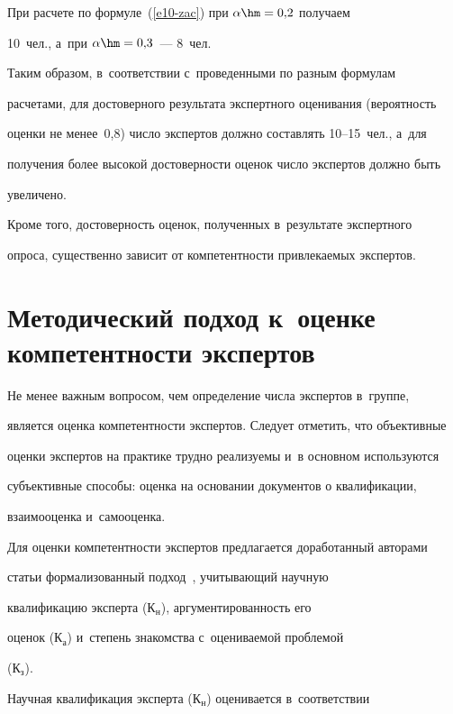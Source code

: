   При расчете по формуле~(\ref{e10-zac}) при $\alpha\hm = 0{,}2$ получаем 

10~чел., а~при $\alpha\hm = 0{,}3$~---  8~чел.

  

  Таким образом, в~соответствии с~проведенными по разным формулам 

расчетами, для достоверного результата экспертного оценивания (вероятность 

оценки не менее~0,8) число экспертов должно составлять 10--15~чел., а~для 

получения более высокой достоверности оценок число экспертов должно быть 

увеличено.

  

  Кроме того, достоверность оценок, полученных в~результате экспертного 

опроса, существенно зависит от компетентности привлекаемых экспертов. 

  

\section{Методический подход к~оценке компетентности экспертов}



  Не менее важным вопросом, чем определение числа экспертов в~группе, 

является оценка компетентности экспертов. Следует отметить, что объективные 

оценки экспертов на практике трудно реализуемы и~в основном используются 

субъективные способы: оценка на основании документов о квалификации, 

взаимооценка и~самооценка.

  

  Для оценки компетентности экспертов предлагается доработанный авторами 

статьи формализованный подход~\cite{10-zac, 13-zac}, учитывающий научную 

квалификацию эксперта ($\mathrm{К}_{\mathrm{н}}$), аргументированность его 

оценок ($\mathrm{К_а}$) и~степень знакомства с~оцениваемой проблемой 

($\mathrm{К_з}$).

  

  Научная квалификация эксперта ($\mathrm{К_н}$) оценивается в~соответствии 

